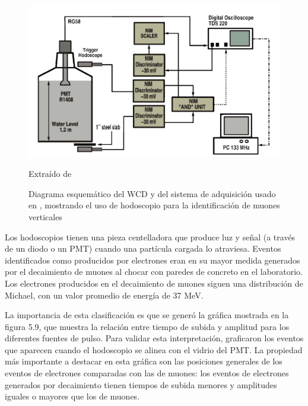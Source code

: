 \documentclass{book}
\begin{document}
\begin{figure}[h] %
\begin{center}
 \includegraphics[width =0.8\linewidth]{WCDSalazar.png}
 
 Extra\'ido de \citep{Salazar}
\caption{Diagrama esquem\'atico del WCD y del sistema de adquisici\'on usado en \citep{Salazar}, mostrando el uso de hodoscopio para la identificaci\'on de muones verticales}
\end{center}
\end{figure}

Los hodoscopios tienen una pieza centelladora que produce luz y se\~nal (a trav\'es de un diodo o un PMT) cuando una part\'icula cargada lo atraviesa. Eventos identificados como producidos por electrones eran en su mayor medida generados por el decaimiento de muones al chocar con paredes de concreto en el laboratorio. Los electrones producidos en el decaimiento de muones siguen una distribuci\'on de Michael, con un valor promedio de energ\'ia de 37 MeV. \citep{ALLISON}

La importancia de esta clasificaci\'on es que se gener\'o la gr\'afica mostrada en la figura 5.9, que muestra la relaci\'on entre tiempo de subida y amplitud para los diferentes fuentes de pulso. Para validar esta interpretaci\'on, graficaron los eventos que aparecen cuando el hodoscopio se alinea con el vidrio del PMT. La propiedad m\'as importante a destacar en esta gr\'afica son las posiciones generales de los eventos de electrones comparadas con las de muones: los eventos de electrones generados por decaimiento tienen tiempos de subida menores y amplitudes iguales o mayores que los de muones. \citep{Salazar}
\end{document}
